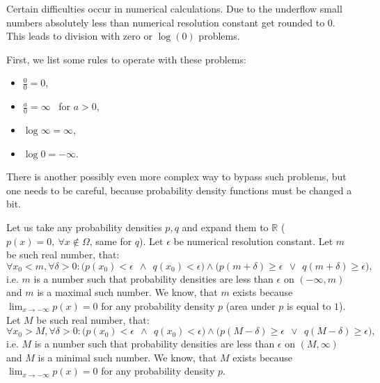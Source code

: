 \documentclass[a4paper, 12pt]{article}
\theoremstyle{definition}
\newcommand{\RR}{\mathbb{R}}
\begin{document}
Certain difficulties occur in numerical calculations. Due to the underflow small numbers absolutely less than numerical resolution constant get rounded to 0. This leads to division with zero or $\log (0)$ problems.

First, we list some rules to operate with these problems:
\begin{itemize}
    \item $\frac{0}{0}=0$,
	\item $\frac{a}{0}=\infty$ \ for $a>0$,
	\item $\log\infty = \infty$,\item $\log 0 = -\infty$.
\end{itemize}

There is another possibly even more complex way to bypass such problems, but one needs to be careful, because probability density functions must be changed a bit.

Let us take any probability densities $p, q$ and expand them to $\RR$ ($p(x) = 0, \  \forall x \notin \Omega$, same for $q$). Let $\epsilon$ be numerical resolution constant. Let $m$ be such real number, that:
\begin{equation*}
    \forall x_0 < m, \forall \delta > 0:
    \Big(p(x_0) < \epsilon \ \  \wedge \ \  q(x_0) < \epsilon\Big)
    \wedge
    \Big(p(m + \delta) \geq \epsilon \ \  \vee \ \  q(m + \delta) \geq \epsilon\Big),
\end{equation*}
i.e. $m$ is a number such that probability densities are less than $\epsilon$ on $(-\infty, m)$ and $m$ is a maximal such number. We know, that $m$ exists because $\lim_{x \rightarrow -\infty} p(x) = 0$ for any probability density $p$ (area under $p$ is equal to $1$). Let $M$ be such real number, that:
\begin{equation*}
    \forall x_0 > M, \forall \delta > 0:
    \Big(p(x_0) < \epsilon \ \  \wedge \ \  q(x_0) < \epsilon\Big)
    \wedge
    \Big(p(M - \delta) \geq \epsilon \ \  \vee \ \  q(M - \delta) \geq \epsilon\Big),
\end{equation*}
i.e. $M$ is a number such that probability densities are less than $\epsilon$ on $(M, \infty)$ and $M$ is a minimal such number. We know, that $M$ exists because $\lim_{x \rightarrow -\infty} p(x) = 0$ for any probability density $p$.
\end{document}
